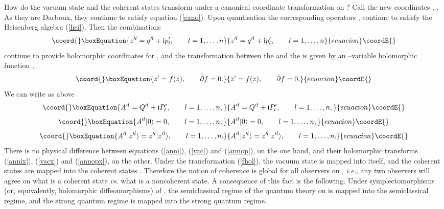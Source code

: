 \documentclass[a4paper,a4paper]{article}
\begin{document}
How do the vacuum state \myHighlight{$|0\rangle$}\coordHE{} and the coherent states \coordHE{}
transform under a canonical coordinate transformation on \coordHE{}? 
Call the new coordinates \coordHE{}, \coordHE{}. As they  are Darboux, they continue 
to satisfy equation (\ref{cano}). Upon quantisation the 
corresponding operators \coordHE{}, \coordHE{} continue to satisfy the Heisenberg 
algebra (\ref{hei}). Then the combinations
\begin{equation}\coord{}\boxEquation{
z'^l=q'^l + {\rm i} p'_l,  \qquad l=1,\ldots, n
\label{xcompcoords}
}{
z'^l=q'^l + {\rm i} p'_l,  \qquad l=1,\ldots, n
}{ecuacion}\coordE{}\end{equation}
continue to provide holomorphic coordinates for \coordHE{}, and the 
transformation between the \coordHE{} and the \coordHE{} is given by an \coordHE{}--variable
holomorphic function \coordHE{},
\begin{equation}\coord{}\boxEquation{
z'=f(z),\qquad \bar\partial f=0.
\label{fhol}
}{
z'=f(z),\qquad \bar\partial f=0.
}{ecuacion}\coordE{}\end{equation}
We can write as above
\begin{equation}\coord{}\boxEquation{
A'^l=Q'^l+{\rm i} P'_l,\qquad l=1,\ldots, n,
\label{annix}
}{
A'^l=Q'^l+{\rm i} P'_l,\qquad l=1,\ldots, n,
}{ecuacion}\coordE{}\end{equation}
\begin{equation}\coord{}\boxEquation{
A'^l|0\rangle = 0,  \qquad l=1, \ldots, n,
\label{vacx}
}{
A'^l|0\rangle = 0,  \qquad l=1, \ldots, n,
}{ecuacion}\coordE{}\end{equation}
\begin{equation}\coord{}\boxEquation{
A'^l|z'^l\rangle=z'^l|z'^l\rangle,\qquad l=1,\ldots, n.
\label{annopx}
}{
A'^l|z'^l\rangle=z'^l|z'^l\rangle,\qquad l=1,\ldots, n.
}{ecuacion}\coordE{}\end{equation}
There is no physical difference between equations (\ref{anni}), (\ref{vac}) and 
(\ref{annop}), on the one hand, and their holomorphic transforms (\ref{annix}), 
(\ref{vacx}) and (\ref{annopx}), on the other. Under the transformation 
(\ref{fhol}), the vacuum state \myHighlight{$|0\rangle$}\coordHE{} is mapped into itself, 
and the coherent states \coordHE{} are mapped into the coherent states \coordHE{}.
Therefore the notion of coherence is global for all observers on \coordHE{}, {\it i.e.}, any two observers will agree on what is a coherent 
state {\it vs.} what is a noncoherent state. A consequence of 
this fact is the following. Under symplectomorphisms (or, equivalently, 
holomorphic diffeomorphisms) of \coordHE{}, the semiclassical regime 
of the quantum theory on \coordHE{} is mapped into the semiclassical regime, 
and the strong quantum regime is mapped into the strong quantum regime.
\end{document}
